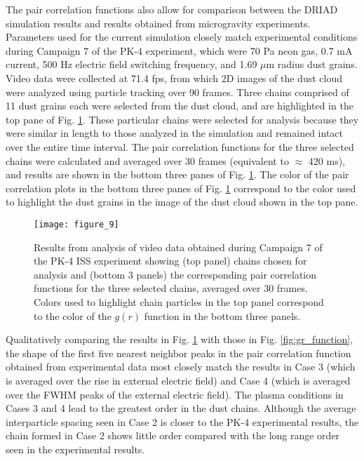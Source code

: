 \documentclass[aip,amsmath,amssymb,graphicx,floatfix,reprint]{revtex4-1}
\begin{document}
The pair correlation functions also allow for comparison between the DRIAD simulation results and results obtained from microgravity experiments.  Parameters used for the current simulation closely match experimental conditions during Campaign 7 of the PK-4 experiment, which were 70 Pa neon gas, 0.7 mA current, 500 Hz electric field switching frequency, and 1.69 $\mu$m radius dust grains.  Video data were collected at 71.4 fps, from which 2D images of the dust cloud were analyzed using particle tracking over 90 frames.  Three chains comprised of 11 dust grains each were selected from the dust cloud, and are highlighted in the top pane of Fig. \ref{fig:pk4_comp}.  These particular chains were selected for analysis because they were similar in length to those analyzed in the simulation and remained intact over the entire time interval.  The pair correlation functions for the three selected chains were calculated and averaged over 30 frames (equivalent to $\approx$ 420 ms), and results are shown in the bottom three panes of Fig. \ref{fig:pk4_comp}.  The color of the pair correlation plots in the bottom three panes of Fig. \ref{fig:pk4_comp} correspond to the color used to highlight the dust grains in the image of the dust cloud shown in the top pane.

\begin{figure}
\texttt{[image: figure\_9]}
\caption{Results from analysis of video data obtained during Campaign 7 of the PK-4 ISS experiment showing (top panel) chains chosen for analysis and (bottom 3 panels) the corresponding pair correlation functions for the three selected chains, averaged over 30 frames.  Colors used to highlight chain particles in the top panel correspond to the color of the $g(r)$ function in the bottom three panels.}
\label{fig:pk4_comp}
\end{figure}

Qualitatively comparing the results in Fig. \ref{fig:pk4_comp} with those in Fig. \ref{fig:gr_function}, the shape of the first five nearest neighbor peaks in the pair correlation function obtained from experimental data most closely match the results in Case 3 (which is averaged over the rise in external electric field) and Case 4 (which is averaged over the FWHM peaks of the external electric field).  The plasma conditions in Cases 3 and 4 lead to the greatest order in the dust chains.  Although the average interparticle spacing seen in Case 2 is closer to the PK-4 experimental results, the chain formed in Case 2 shows little order compared with the long range order seen in the experimental results.
\end{document}
